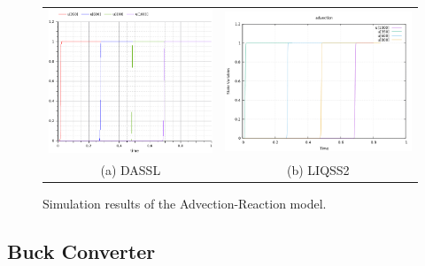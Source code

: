 \documentclass[10pt]{article}
\begin{document}
\begin{figure}[htbp]
\begin{tabular}{cc}
   \includegraphics[scale=0.45]{./Fig/adv-om.png}&\includegraphics[scale=0.45]{./Fig/adv-liqss.png}\\(a) DASSL&(b) LIQSS2
    \end{tabular}
\vspace{-0.2cm}
\caption{Simulation results of the Advection-Reaction model.}\label{Fig1}
\end{figure}

\newpage

\subsection{Buck Converter}
\end{document}
